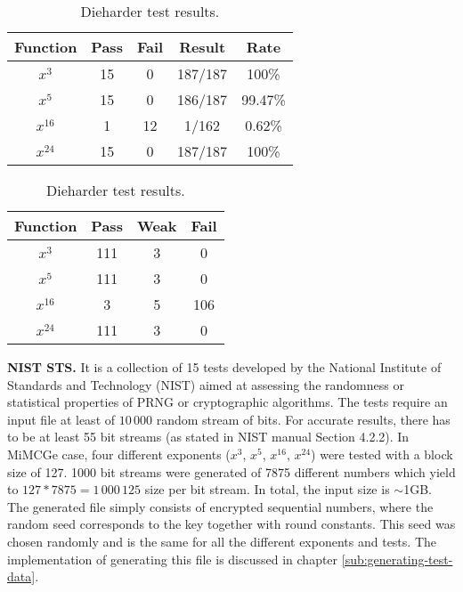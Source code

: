 \documentclass{Resources/UoBLab1}
\theoremstyle{definition}
\begin{document}
\begin{table}[]
    \begin{minipage}{.5\textwidth}
        \centering
        \begin{tabular}{|c|c|c|c|c|}
            \hline
            Function & Pass & Fail & Result & Rate \\
            \hline
            $x^3$ & 15 & 0 & 187/187 & 100\% \\
            $x^5$ & 15 & 0 & 186/187 & 99.47\% \\
            $x^{16}$ & 1 & 12 & 1/162 & 0.62\% \\
            $x^{24}$ & 15 & 0 & 187/187 & 100\% \\
            \hline
        \end{tabular}
        \caption{NIST test results.}\label{tab:NIST-results}
    \end{minipage}%
    \begin{minipage}{.5\textwidth}
        \centering
        \begin{tabular}{|c|c|c|c|}
            \hline
            Function & Pass & Weak & Fail \\
            \hline
            $x^3$ & 111 & 3 & 0 \\
            $x^5$ & 111 & 3 & 0 \\
            $x^{16}$ & 3 & 5 & 106 \\
            $x^{24}$ & 111 & 3 & 0 \\
            \hline
        \end{tabular}
        \caption{Dieharder test results.}\label{tab:dieharder-results}
    \end{minipage}
\end{table}

\noindent\textbf{NIST STS.} It is a collection of 15 tests developed by the National Institute of Standards and Technology (NIST) aimed at assessing the randomness or statistical properties of PRNG or cryptographic algorithms. The tests require an input file at least of $10\,000$ random stream of bits. For accurate results, there has to be at least 55 bit streams (as stated in NIST manual Section 4.2.2\cite{NIST}). In MiMCGe case, four different exponents ($x^3$, $x^5$, $x^{16}$, $x^{24}$) were tested with a block size of 127. 1000 bit streams were generated of 7875 different numbers which yield to $127 * 7875 = 1\,000\,125$ size per bit stream. In total, the input size is $\sim$1GB. The generated file simply consists of encrypted sequential numbers, where the random seed corresponds to the key together with round constants. This seed was chosen randomly and is the same for all the different exponents and tests. The implementation of generating this file is discussed in chapter \ref{sub:generating-test-data}.
\end{document}
